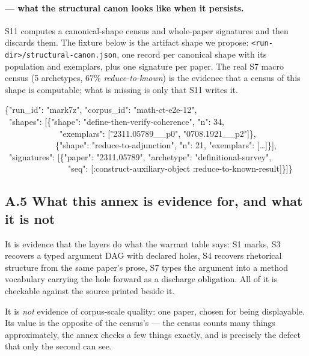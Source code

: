 \paragraph{ --- what the structural canon looks like when it persists.}
S11 computes a canonical-shape census and whole-paper signatures and then
discards them. The fixture below is the artifact shape we propose:
\texttt{<run-dir>/structural-canon.json}, one record per canonical shape with
its population and exemplars, plus one signature per paper. The real S7 macro
census (5 archetypes, $67\%$ \emph{reduce-to-known}) is the evidence that a
census of this shape is computable; what is missing is only that S11 writes it.

\begin{center}\small
\begin{minipage}{0.86\textwidth}\ttfamily\footnotesize\raggedright
\{"run\_id": "mark7z", "corpus\_id": "math-ct-e2e-12",\\
\ "shapes": [\{"shape": "define-then-verify-coherence", "n": 34,\\
\ \ \ \ \ \ \ \ \ \ \ \ \ "exemplars": ["2311.05789\_\_p0", "0708.1921\_\_p2"]\},\\
\ \ \ \ \ \ \ \ \ \ \ \ \{"shape": "reduce-to-adjunction", "n": 21, "exemplars": [\dots]\}],\\
\ "signatures": [\{"paper": "2311.05789", "archetype": "definitional-survey",\\
\ \ \ \ \ \ \ \ \ \ \ \ \ \ \ "seq": [:construct-auxiliary-object :reduce-to-known-result]\}]\}
\end{minipage}
\end{center}

\subsection*{A.5 What this annex is evidence for, and what it is not}

It is evidence that the layers do what the warrant table says: S1 marks, S3
recovers a typed argument DAG with declared holes, S4 recovers rhetorical
structure from the same paper's prose, S7 types the argument into a method
vocabulary carrying the hole forward as a discharge obligation. All of it is
checkable against the source printed beside it.

It is \emph{not} evidence of corpus-scale quality: one paper, chosen for being
displayable. Its value is the opposite of the census's --- the census counts
many things approximately, the annex checks a few things exactly, and 
is precisely the defect that only the second can see.
